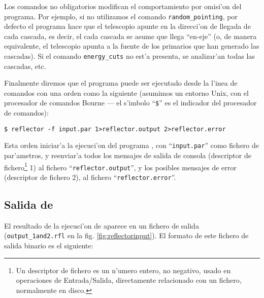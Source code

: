 Los comandos no obligatorios modifican el comportamiento por omisi'on
del programa.  Por ejemplo, si no utilizamos el comando
\texttt{random\_pointing}, por defecto el programa hace que el
telescopio apunte en la direcci'on de llegada de cada cascada, es
decir, el cada cascada se asume que llega ``en-eje'' (o, de manera
equivalente, el telescopio apunta a la fuente de los primarios que han
generado las cascadas).  Si el comando \texttt{energy\_cuts} no est'a
presenta, se analizar'an todas las cascadas, etc.

Finalmente diremos que el programa puede ser ejecutado desde la l'inea
de comandos con una orden como la siguiente (asumimos un entorno Unix,
con el procesador de comandos Bourne --- el s'imbolo ``\texttt{\$}''
es el indicador del procesador de comandos):
%
\begin{center}
  \texttt{\$ reflector -f input.par 1>reflector.output 2>reflector.error}
\end{center}
%
Esta orden iniciar'a la ejecuci'on del programa , con
``\texttt{input.par}'' como fichero de par'ametros, y reenviar'a todos
los mensajes de salida de consola (descriptor de fichero\footnote{Un
  descriptor de fichero es un n'umero entero, no negativo, usado en
  operaciones de Entrada/Salida, directamente relacionado con un
  fichero, normalmente en disco.} 1) al fichero
``\texttt{reflector.output}'', y los posibles mensajes de error
(descriptor de fichero 2), al fichero ``\texttt{reflector.error}''.

\subsection{Salida de }

El resultado de la ejecuci'on de  aparece en un fichero de
salida (\texttt{output\_1and2.rfl} en la fig.
\ref{fig:reflectorinput}).  El formato de este fichero de salida
binario es el siguiente:

